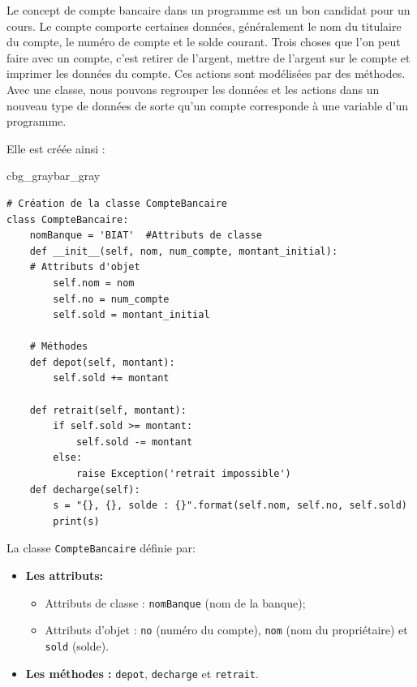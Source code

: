 \documentclass[%
oneside,                 %
final,                   %
10pt]{article}
\newenvironment{_pro_tight}[2]{
   \def\FrameCommand{\color{#2}\vrule width 1mm\normalcolor\colorbox{#1}}
   \FrameRule0.6pt\MakeFramed {\advance\hsize-2mm\FrameRestore}\vskip3mm}
   {\vskip0mm\endMakeFramed}
\newenvironment{pro}[2]{
\bgroup\rmfamily
\fboxsep=0mm\relax
\begin{_pro_tight}{#1}{#2}
\list{}{\parsep=-2mm\parskip=0mm\topsep=0pt\leftmargin=2mm
\rightmargin=2\leftmargin\leftmargin=4pt\relax}
\item\relax}
{\endlist\end{_pro_tight}\egroup}
\begin{document}
Le concept de compte bancaire dans un programme est un bon candidat pour un cours. Le compte comporte certaines données, généralement le nom du titulaire du compte, le numéro de compte et le solde courant. Trois choses que l'on peut faire avec un compte, c'est retirer de l'argent, mettre de l'argent sur le compte et imprimer les données du compte. Ces actions sont modélisées par des méthodes. Avec une classe, nous pouvons regrouper les données et les actions dans un nouveau type de données de sorte qu'un compte corresponde à une variable d'un programme.

Elle est créée ainsi :

\begin{pro}{cbg_gray}{bar_gray}\begin{verbatim}
# Création de la classe CompteBancaire
class CompteBancaire:
    nomBanque = 'BIAT'	#Attributs de classe
    def __init__(self, nom, num_compte, montant_initial):
	# Attributs d'objet
        self.nom = nom
        self.no = num_compte
        self.sold = montant_initial

    # Méthodes
    def depot(self, montant):
        self.sold += montant
        
    def retrait(self, montant):
        if self.sold >= montant:
            self.sold -= montant
        else:
            raise Exception('retrait impossible')
    def decharge(self):
        s = "{}, {}, solde : {}".format(self.nom, self.no, self.sold)
        print(s)
\end{verbatim}
\end{pro}
\noindent

La classe \texttt{CompteBancaire} définie par:
\begin{itemize}
\item \textbf{Les attributs:}
\begin{itemize}

 \item Attributs de classe : \texttt{nomBanque} (nom de la banque);

 \item Attributs d'objet : \texttt{no} (numéro du compte), \texttt{nom} (nom du propriétaire) et \texttt{sold} (solde).

\end{itemize}

\noindent
\item \textbf{Les méthodes :} \texttt{depot}, \texttt{decharge} et \texttt{retrait}.
\end{itemize}
\end{document}
